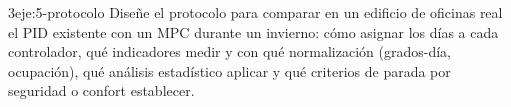 \begin{ejercicio}{3}{eje:5-protocolo}
Diseñe el protocolo para comparar en un edificio de oficinas real el PID existente con un MPC durante un invierno: cómo asignar los días a cada controlador, qué indicadores medir y con qué normalización (grados-día, ocupación), qué análisis estadístico aplicar y qué criterios de parada por seguridad o confort establecer.
\end{ejercicio}

